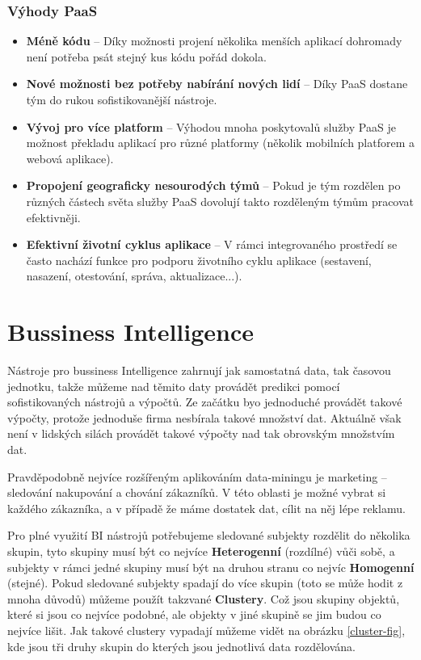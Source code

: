 \subsubsection{Výhody PaaS}
\begin{itemize}
  \item \textbf{Méně kódu} -- Díky možnosti projení několika menších aplikací dohromady není potřeba psát stejný kus kódu pořád dokola.
  \item \textbf{Nové možnosti bez potřeby nabírání nových lidí} -- Díky PaaS dostane tým do rukou sofistikovanější nástroje.
  \item \textbf{Vývoj pro více platform} -- Výhodou mnoha poskytovalů služby PaaS je možnost překladu aplikací pro různé platformy (několik mobilních platforem a webová aplikace).
  \item \textbf{Propojení geograficky nesourodých týmů} -- Pokud je tým rozdělen po různých částech světa služby PaaS dovolují takto rozděleným týmům pracovat efektivněji.
  \item \textbf{Efektivní životní cyklus aplikace} -- V rámci integrovaného prostředí se často nachází funkce pro podporu životního cyklu aplikace (sestavení, nasazení, otestování, správa, aktualizace...). \cite{co-je-paas}
\end{itemize}

\section{Bussiness Intelligence}
\par Nástroje pro bussiness Intelligence zahrnují jak samostatná data, tak časovou jednotku, takže můžeme nad těmito daty provádět predikci pomocí sofistikovaných nástrojů a výpočtů. Ze začátku byo jednoduché provádět takové výpočty, protože jednoduše firma nesbírala takové množství dat. Aktuálně však není v lidských silách provádět takové výpočty nad tak obrovským množstvím dat. \cite{data-science-business}

\par Pravděpodobně nejvíce rozšířeným aplikováním data-miningu je marketing -- sledování nakupování a chování zákazníků. V této oblasti je možné vybrat si každého zákazníka, a v případě že máme dostatek dat, cílit na něj lépe reklamu. \cite{data-science-business}

\par Pro plné využití BI nástrojů potřebujeme sledované subjekty rozdělit do několika skupin, tyto skupiny musí být co nejvíce \textbf{Heterogenní} (rozdílné) vůči sobě, a subjekty v rámci jedné skupiny musí být na druhou stranu co nejvíc \textbf{Homogenní} (stejné). Pokud sledované subjekty spadají do více skupin (toto se může hodit z mnoha důvodů) můžeme použít takzvané  \textbf{Clustery}. Což jsou skupiny objektů, které si jsou co nejvíce podobné, ale objekty v jiné skupině se jim budou co nejvíce lišit. \cite{data-science-business} Jak takové clustery vypadají můžeme vidět na obrázku \ref{cluster-fig}, kde jsou tři druhy skupin do kterých jsou jednotlivá data rozdělována.

